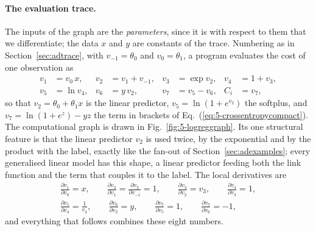 \paragraph{The evaluation trace.}
The inputs of the graph are the \emph{parameters}, since it is with respect
to them that we differentiate; the data $x$ and $y$ are constants of the
trace.  Numbering as in Section~\ref{sec:adtrace}, with $v_{-1}=\theta_0$
and $v_0=\theta_1$, a program evaluates the cost of one observation as
\begin{equation}
  \begin{aligned}
    v_1 &= v_0\,x, & v_2 &= v_1 + v_{-1}, & v_3 &= \exp v_2, & v_4 &= 1+v_3,\\
    v_5 &= \ln v_4, & v_6 &= y\,v_2, & v_7 &= v_5 - v_6, & C_i &= v_7 ,
  \end{aligned}
  \label{eq:5-adtrace}
\end{equation}
so that $v_2=\theta_0+\theta_1x$ is the linear predictor, $v_5=\ln(1+e^{v_2})$
the softplus, and $v_7=\ln(1+e^{z})-yz$ the term in brackets of
Eq.~(\ref{eq:5-crossentropycompact}).  The computational graph is drawn in
Fig.~\ref{fig:5-logreggraph}.  Its one structural feature is that the linear
predictor $v_2$ is used twice, by the exponential and by the product with
the label, exactly like the fan-out of Section~\ref{sec:adexamples}; every
generalised linear model has this shape, a linear predictor feeding both the
link function and the term that couples it to the label.  The local
derivatives are
\begin{equation}
  \begin{gathered}
  \frac{\partial v_1}{\partial v_0}=x,\qquad
  \frac{\partial v_2}{\partial v_1}=\frac{\partial v_2}{\partial v_{-1}}=1,\qquad
  \frac{\partial v_3}{\partial v_2}=v_3,\qquad
  \frac{\partial v_4}{\partial v_3}=1,\\
  \frac{\partial v_5}{\partial v_4}=\frac{1}{v_4},\qquad
  \frac{\partial v_6}{\partial v_2}=y,\qquad
  \frac{\partial v_7}{\partial v_5}=1,\qquad
  \frac{\partial v_7}{\partial v_6}=-1 ,
  \end{gathered}
  \label{eq:5-adlocal}
\end{equation}
and everything that follows combines these eight numbers.

